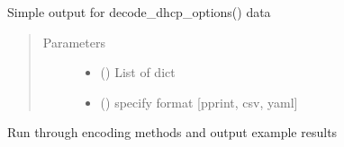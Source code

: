 \documentclass[letterpaper,10pt,english]{sphinxmanual}
\begin{document}
\begin{fulllineitems}
\begin{fulllineitems}
\end{fulllineitems}


\begin{fulllineitems}
\label{\detokenize{dhcp_decode-class:bloxone.dhcp_decode.output_decoded_options}}
\sphinxAtStartPar
Simple output for decode\_dhcp\_options() data
\begin{quote}\begin{description}
\item[{Parameters}] \leavevmode\begin{itemize}
\item {} 
\sphinxAtStartPar
{} () \textendash{} List of dict

\item {} 
\sphinxAtStartPar
{} () \textendash{} specify format {[}pprint, csv, yaml{]}

\end{itemize}

\end{description}\end{quote}

\end{fulllineitems}


\begin{fulllineitems}
\label{\detokenize{dhcp_decode-class:bloxone.dhcp_decode.tests}}
\sphinxAtStartPar
Run through encoding methods and output example results

\end{fulllineitems}



\end{fulllineitems}
\end{document}
